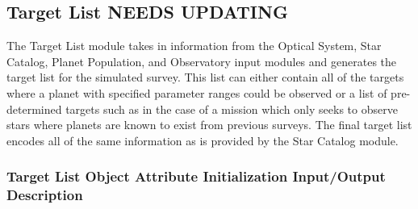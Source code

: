 \documentclass[cleanfoot]{asme2ej}
\begin{document}

\subsection{Target List NEEDS UPDATING}
The Target List module takes in information from the Optical System, Star Catalog, Planet Population, and Observatory input modules and generates the target list for the simulated survey.  This list can either contain all of the targets where a planet with specified parameter ranges could be observed or a list of pre-determined targets such as in the case of a mission which only seeks to observe stars where planets are known to exist from previous surveys.  The final target list encodes all of the same information as is provided by the Star Catalog module.

\label{sec:targetlist}
\subsubsection{Target List Object Attribute Initialization Input/Output Description}
\end{document}
